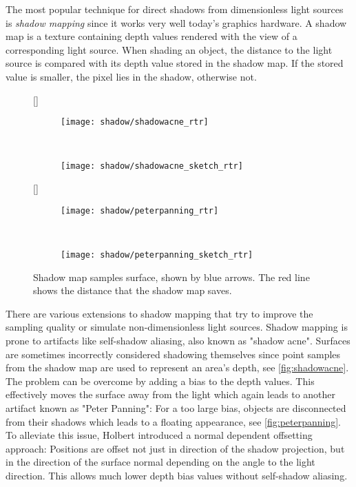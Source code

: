 \documentclass[thesis.tex]{subfiles}
\begin{document}
The most popular technique for direct shadows from dimensionless light sources is \emph{shadow mapping} \cite{bib:shadowmapping} since it works very well today's graphics hardware.
A shadow map is a texture containing depth values rendered with the view of a corresponding light source.
When shading an object, the distance to the light source is compared with its depth value stored in the shadow map.
If the stored value is smaller, the pixel lies in the shadow, otherwise not.


\begin{figure}[h]
\centering
{}[\textwidth]{
	\begin{subfigure}[b]{0.32\textwidth}
		\texttt{[image: shadow/shadowacne\_rtr]}
   	\end{subfigure}
   	~~~~
 	\begin{subfigure}[b]{0.4\textwidth}
	 	\texttt{[image: shadow/shadowacne\_sketch\_rtr]}
 	\end{subfigure}
}

\vspace{0.5cm}

[\textwidth]{
	\begin{subfigure}[b]{0.32\textwidth}
		\texttt{[image: shadow/peterpanning\_rtr]}
   	\end{subfigure}
   	~~~~
 	\begin{subfigure}[b]{0.4\textwidth}
	 	\texttt{[image: shadow/peterpanning\_sketch\_rtr]}
 	\end{subfigure}
}
\caption{\cite[p.351]{bib:RealtimeRenderingBook} Shadow map samples surface, shown by blue arrows. The red line shows the distance that the shadow map saves.}
\end{figure}
There are various extensions to shadow mapping that try to improve the sampling quality or simulate non-dimensionless light sources.
Shadow mapping is prone to artifacts like self-shadow aliasing, also known as "shadow acne".
Surfaces are sometimes incorrectly considered shadowing themselves since point samples from the shadow map are used to represent an area's depth, see \autoref{fig:shadowacne}.
The problem can be overcome by adding a bias to the depth values.
This effectively moves the surface away from the light which again leads to another artifact known as "Peter Panning":
For a too large bias, objects are disconnected from their shadows which leads to a floating appearance, see \autoref{fig:peterpanning}.
\\
To alleviate this issue, Holbert \cite{bib:normaloffsetshadowmapping} introduced a normal dependent offsetting approach:
Positions are offset not just in direction of the shadow projection, but in the direction of the surface normal depending on the angle to the light direction.
This allows much lower depth bias values without self-shadow aliasing.
\end{document}
